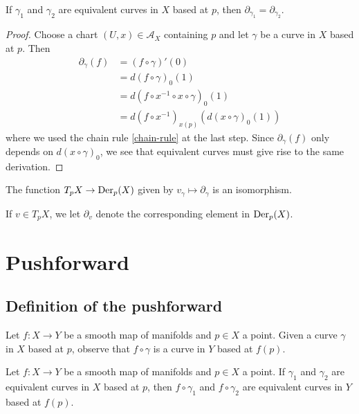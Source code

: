 \begin{lemma}
	If $\gamma_1$ and $\gamma_2$ are equivalent curves in $X$ based at $p$, then $\partial_{\gamma_1} = \partial_{\gamma_2}$. 
\end{lemma}

\begin{proof}
	Choose a chart $(U, x) \in \mathscr{A}_X$ containing $p$ and let $\gamma$ be a curve in $X$  based at $p$. Then
	\[ \begin{aligned} \partial_{\gamma}(f) &= (f \circ \gamma)'(0) \\
	&= d(f \circ \gamma)_0(1) \\
	&= d(f \circ x^{-1} \circ x \circ \gamma)_0 (1) \\
	&= d(f \circ x^{-1})_{x(p)} \left( d(x \circ \gamma)_0 (1) \right)
	 \end{aligned} \]
	where we used the chain rule \ref{chain-rule} at the last step. Since $\partial_\gamma(f)$ only depends on $d(x \circ \gamma)_0$, we see that equivalent curves must give rise to the same derivation. 
\end{proof}

\begin{theorem}
	The function $T_p X \to \operatorname{Der}_p(X)$ given by $v_\gamma \mapsto \partial_\gamma$ is an isomorphism. 
\end{theorem}


\begin{definition}
	If $v \in T_p X$, we let $\partial_v$ denote the corresponding element in $\operatorname{Der}_p(X)$. 
\end{definition}


\section{Pushforward}

\subsection{Definition of the pushforward}

Let $f : X \to Y$ be a smooth map of manifolds and $p \in X$ a point. Given a curve $\gamma$ in $X$ based at $p$, observe that $f \circ \gamma$ is a curve in $Y$ based at $f(p)$. 

\begin{lemma}
	Let $f : X \to Y$ be a smooth map of manifolds and $p \in X$ a point. If $\gamma_1$ and $\gamma_2$ are equivalent curves in $X$ based at $p$, then $f \circ \gamma_1$ and $f \circ \gamma_2$ are equivalent curves in $Y$ based at $f(p)$. 
\end{lemma}


